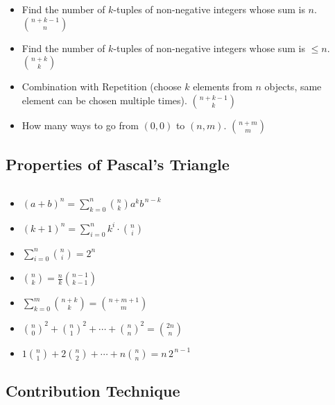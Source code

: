 \vspace{-4.5mm}
{\footnotesize
\begin{itemize}
\item Find the number of $k$-tuples of non-negative integers whose sum is $n$. \quad $\binom{n+k-1}{n}$
\item Find the number of $k$-tuples of non-negative integers whose sum is $\le n$. \quad $\binom{n+k}{k}$
\item Combination with Repetition (choose $k$ elements from $n$ objects, same element can be chosen multiple times). \quad $\binom{n+k-1}{k}$
\item How many ways to go from $(0,0)$ to $(n,m)$. \quad $\binom{n+m}{m}$
\end{itemize}\medskip\medskip\medskip
}


\subsection{\small Properties of Pascal's Triangle  \scriptsize}
\inputminted[breaklines, breakanywhere]{c++}{code/04-Combinatorics and Probability/09-Properties of Pascal's Triangle.cpp}

\vspace{-4.5mm}
{\footnotesize
\begin{itemize}
\item $(a+b)^n = \sum_{k=0}^{n} \binom{n}{k} a^k b^{\,n-k}$ 
\item $(k+1)^n = \sum_{i=0}^{n} k^i \cdot \binom{n}{i}$ 
\item $\displaystyle \sum_{i=0}^{n} \binom{n}{i} = 2^n$ 
\item $\binom{n}{k} = \frac{n}{k} \binom{n-1}{k-1}$ 
\item $\displaystyle \sum_{k=0}^{m} \binom{n+k}{k} = \binom{n+m+1}{m}$ 
\item $\binom{n}{0}^2 + \binom{n}{1}^2 + \cdots + \binom{n}{n}^2 = \binom{2n}{n}$
\item $1\binom{n}{1} + 2\binom{n}{2} + \cdots + n\binom{n}{n} = n \, 2^{\,n-1}$ 
\end{itemize}
}

\subsection{\small Contribution Technique  \scriptsize}
\inputminted[breaklines, breakanywhere]{c++}{code/04-Combinatorics and Probability/11-Contribution Technique.cpp}

